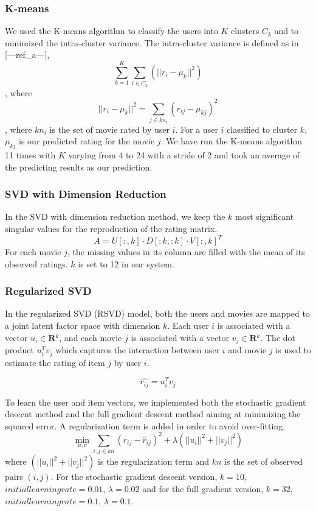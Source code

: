\documentclass[10pt,conference,compsocconf]{IEEEtran}
\begin{document}
\subsubsection{K-means}
We used the K-means algorithm to classify the users into $K$ clusters $C_k$ and to minimized the intra-cluster variance. The intra-cluster variance is defined as in [---ref\_a---], $$   \sum_{k=1}^K \sum_{i \in C_k} (||r_{i}-\mu_k||^2)  $$, where $$  ||r_{i}-\mu_k||^2 = \sum_{j \in kn_i}(r_{ij}-\mu_{kj})^2  $$, where $kn_i$ is the set of movie rated by user $i$.
 For a user $i$ classified to cluster $k$, $\mu_{kj}$ is our predicted rating for the movie $j$. We have run the K-means algorithm 11 times with $K$ varying from 4 to 24 with a stride of 2 and took an average of the predicting results as our prediction.

\subsubsection{SVD with Dimension Reduction}
In the SVD with dimension reduction method, we keep the $k$ most significant singular values for the reproduction of the rating matrix. 
\[A = U[:,k] \cdot D[:k,:k] \cdot V{[:,k]^T}\]
For each movie $j$, the missing values in its column are filled with the mean of its observed ratings. $k$ is set to 12 in our system.

\subsubsection{Regularized SVD}
In the regularized SVD (RSVD) model, both the users and movies are mapped to a joint latent factor space with dimension $k$. Each user $i$ is associated with a vector $u_{i} \in \textbf{R$^k$}$, and each movie $j$ is associated with a vector $v_{j} \in \textbf{R$^k$} $. The dot product $u_i^Tv_j$ which captures the interaction between user $i$ and movie $j$ is used to estimate the rating of item $j$ by user $i$.

$$ \hat{r_{ij}}=u_{i}^{T}v_{j} $$

To learn the user and item vectors, we implemented both the stochastic gradient descent method and the full gradient descent method aiming at minimizing the squared error. A regularization term is added in order to avoid over-fitting.
$$  \min \limits_{u, v} \sum_{i, j\in kn} (r_{ij} - \hat r_{ij})^2 + \lambda (||u_i||^2 + ||v_j||^2)  $$
where $ (||u_i||^2 + ||v_j||^2)$ is the regularization term and $kn$ is the set of observed pairs $(i, j)$. For the stochastic gradient descent version, $k=10$, $initial learning rate=0.01$, $\lambda=0.02$ and for the full gradient version, $k=32$, $initial learning rate=0.1$, $\lambda=0.1$.
\end{document}
